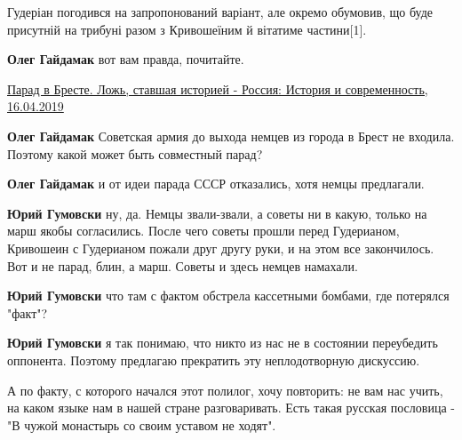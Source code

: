 \begin{itemize}
Гудеріан погодився на запропонований варіант, але окремо обумовив, що буде
присутній на трибуні разом з Кривошеїним й вітатиме частини[1].


\textbf{Олег Гайдамак} вот вам правда, почитайте.

\href{zen.yandex.ru/media/ava/parad-v-breste-loj-stavshaia-istoriei-5cb5d89fa4186400b437b838}{%
Парад в Бресте. Ложь, ставшая историей - Россия: История и современность, 16.04.2019}


\textbf{Олег Гайдамак} Советская армия до выхода немцев из города в Брест не входила. Поэтому какой может быть совместный парад?


\textbf{Олег Гайдамак} и от идеи парада СССР отказались, хотя немцы предлагали.


\textbf{Юрий Гумовски} ну, да. Немцы звали-звали, а советы ни в какую, только
на марш якобы согласились. После чего советы прошли перед Гудерианом, Кривошеин
с Гудерианом пожали друг другу руки, и на этом все закончилось. Вот и не парад,
блин, а марш. Советы и здесь немцев намахали.


\textbf{Юрий Гумовски} что там с фактом обстрела кассетными бомбами, где потерялся "факт"?



\textbf{Юрий Гумовски} я так понимаю, что никто из нас не в состоянии переубедить
оппонента. Поэтому предлагаю прекратить эту неплодотворную дискуссию.

А по факту, с которого начался этот полилог, хочу повторить: не вам нас учить,
на каком языке нам в нашей стране разговаривать. Есть такая русская пословица -
"В чужой монастырь со своим уставом не ходят".


\end{itemize}
